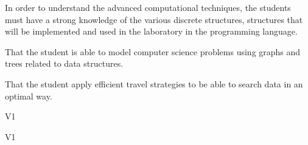 \begin{syllabus}


\begin{justification}
In order to understand the advanced computational techniques, the students must have a strong knowledge of the
various discrete structures, structures that will be implemented and used in the laboratory in the programming language.
\end{justification}

\begin{goals}
\item That the student is able to model computer science problems using graphs and trees related to data structures.
\item That the student apply efficient travel strategies to be able to search data in an optimal way.
\end{goals}

\begin{outcomes}{V1}
    \item {} %
    \item {} %
    \item {} %
    \item {} %
\end{outcomes}

\begin{competences}{V1}
    \item {} %
    \item {}
    \item {} %
    \item {} %
    \item {} %
    \item {} %
\end{competences}


\end{syllabus}
